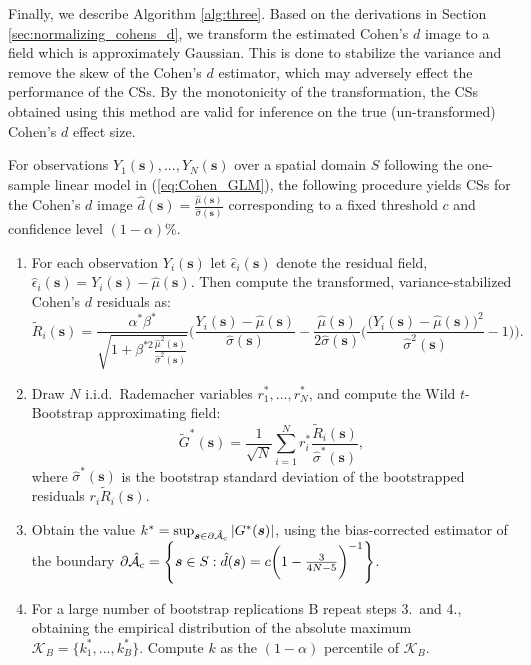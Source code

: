 Finally, we describe Algorithm \ref{alg:three}. Based on the derivations in Section \ref{sec:normalizing_cohens_d}, we transform the estimated Cohen's $d$ image to a field which is approximately Gaussian. This is done to stabilize the variance and remove the skew of the Cohen's $d$ estimator, which may adversely effect the performance of the CSs. By the monotonicity of the transformation, the CSs obtained using this method are valid for inference on the true (un-transformed) Cohen's $d$ effect size. 

\begin{algorithm}
\label{alg:three}
For observations $Y_{1}(\bm{s}), ..., Y_{N}(\bm{s})$ over a spatial domain $S$ following the one-sample linear model in (\ref{eq:Cohen_GLM}), the following procedure yields CSs for the Cohen's $d$ image $\hat{d}(\bm{s}) = \frac{\hat{\mu}(\bm{s})}{\hat{\sigma}(\bm{s})}$ corresponding to a fixed threshold $c$ and confidence level $(1 - \alpha)\%$.
\begin{enumerate}
\item For each observation $Y_i(\bm{s})$ let $\hat{\epsilon}_{i}(\bm{s})$ denote the residual field, $\hat{\epsilon}_{i}(\bm{s}) = Y_{i}(\bm{s}) - \hat{\mu}(\bm{s})$. Then compute the transformed, variance-stabilized Cohen's $d$ residuals as: 
$$\tilde{R}_{i}(\bm{s}) = \frac{\alpha^{*}\beta^{*}}{\sqrt{1 + \beta^{*2}\frac{\hat{\mu}^{2}(\bm{s})}{\hat{\sigma}^{2}(\bm{s})}}} \Bigg(\frac{Y_{i}(\bm{s}) - \hat{\mu}(\bm{s})}{\hat{\sigma}(\bm{s})} - \frac{\hat{\mu}(\bm{s})}{2\hat{\sigma}(\bm{s})}\Bigg( \frac{\big(Y_{i}(\bm{s}) - \hat{\mu}(\bm{s})\big)^{2}}{\hat{\sigma}^{2}(\bm{s})} - 1 \Bigg)\Bigg).$$ 
\item Draw $N$ i.i.d.\ Rademacher variables $r_{1}^{*}, ..., r_{N}^{*}$, and compute the Wild $t$-Bootstrap approximating field:
$$\tilde{G}^{*}(\bm{s}) = \frac{1}{\sqrt{N}}\sum_{i=1}^{N} r^*_i\frac{\tilde{R}_{i}(\bm{s})}{\hat{\sigma}^*(\bm{s})},$$
where $\hat{\sigma}^{*}(\bm{s})$ is the bootstrap standard deviation of the bootstrapped residuals $r_{i}\tilde{R}_{i}(\bm{s})$. 
\item Obtain the value $k^{*} = \sup_{\bm{s}\in\operatorname{\partial\hat{\mathcal{A}}_{c}}}|G^{*}(\bm{s})|$, using the bias-corrected estimator of the boundary $\operatorname{\partial\hat{\mathcal{A}}_{c}} = \Bigg\{\bm{s} \in S : \hat{d}(\bm{s}) = c\bigg(1 - \frac{3}{4N - 5}\bigg)^{-1} \Bigg\}$.
\item For a large number of bootstrap replications B repeat steps 3.\ and 4., obtaining the empirical distribution of the absolute maximum $\mathcal{K}_{B} = \{k_{1}^{*}, ..., k_{B}^{*}\}$. Compute $k$ as the $(1 - \alpha)$ percentile of $\mathcal{K}_{B}$.

\end{enumerate}
\end{algorithm}
